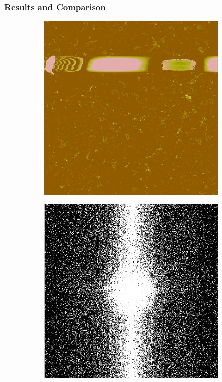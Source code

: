 \documentclass{article}
\begin{document}
\subsubsection{Results and Comparison}\label{sec:Results and Comparison}

\begin{figure}[!htb]
        \begin{subfigure}[b]{0.24\textwidth}
                \includegraphics[width=\linewidth]{step1}
                \caption{}
                \label{fig:initial amplitude }
        \end{subfigure}%
        \hspace{\fill}
        \begin{subfigure}[b]{0.24\textwidth}
                \includegraphics[width=\linewidth]{step2}

\end{subfigure}
\end{figure}
\end{document}
